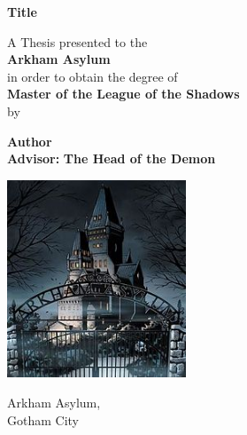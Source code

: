 \begin{titlepage}
    \begin{center}
        \vspace*{1cm}
        
        \Huge
        \textbf{Title}
        \vspace{1.5cm}
        
        \Large
         A Thesis presented to the\\
         \LARGE
         \textbf{Arkham Asylum}\\
        \large 
        in order to obtain the degree of\\
        \LARGE
        \textbf{Master of the League of the Shadows}\\ 
        \large
        by
        
        \LARGE
        \textbf{Author}\\
        \vfill
        \LARGE
        \textbf{Advisor:}
        \textbf{The Head of the Demon}
        
        
        \vspace{0.8cm}
        
        \includegraphics[width=0.4\textwidth]{images/arkham.jpg}
        
        \Large
        Arkham Asylum,\\
        Gotham City
    \end{center}
\end{titlepage}

